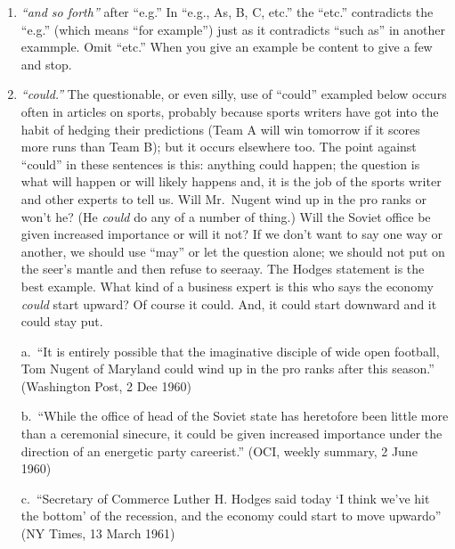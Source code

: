 \documentclass[
    oneside,
    11pt,
]{memoir}
\begin{document}
\begin{enumerate}
  (1) The analyst gave a talk on the defense of Matsu and Quemoy. 
  
  (2) The analyst gave a talk \enquote{The Defense of Matsu and Quemoy} (or, a talk entitled \enquote{The Defense of Matsu and Quemoy}). 
  
  (3) The analyst gave a talk on \enquote{The Defense of Matsu and Quemoy.} 
  
  \item \emph{\enquote{and so forth}} after \enquote{e.g.} In \enquote{e.g., As, B, C, etc.} the \enquote{etc.} contradicts the \enquote{e.g.} (which means \enquote{for example}) just as it contradicts \enquote{such as} in another exammple. Omit \enquote{etc.} When you give an example be content to give a few and stop.
  
  \item \emph{\enquote{could.}} The questionable, or even silly, use of \enquote{could} exampled below occurs often in articles on sports, probably because sports writers have got into the habit of hedging their predictions (Team A will win tomorrow if it scores more runs than Team B); but it occurs elsewhere too. The point against \enquote{could} in these sentences is this: anything could happen; the question is what will happen or will likely happens and, it is the job of the sports writer and other experts to tell us. Will Mr.\ Nugent wind up in the pro ranks or won't he? (He \emph{could} do any of a number of thing.) Will the Soviet office be given increased importance or will it not? If we don't want to say one way or another, we should use \enquote{may} or let the question alone; we should not put on the seer's mantle and then refuse to seeraay. The Hodges statement is the best example. What kind of a business expert is this who says the economy \emph{could} start upward? Of course it could. And, it could start downward and it could stay put. 
  
  a.\ \enquote{It is entirely possible that the imaginative disciple of wide open football, Tom Nugent of Maryland could wind up in the pro ranks after this season.} (Washington Post, 2 Dee 1960) 
  
  b.\ \enquote{While the office of head of the Soviet state has heretofore been little more than a ceremonial sinecure, it could be given increased importance under the direction of an energetic party careerist.} (OCI, weekly summary, 2 June 1960) 
  
  c.\ \enquote{Secretary of Commerce Luther H. Hodges said today \enquote{I think we've hit the bottom} of the recession, and the economy could start to move upwardo} (NY Times, 13 March 1961) 
  

\end{enumerate}
\end{document}
